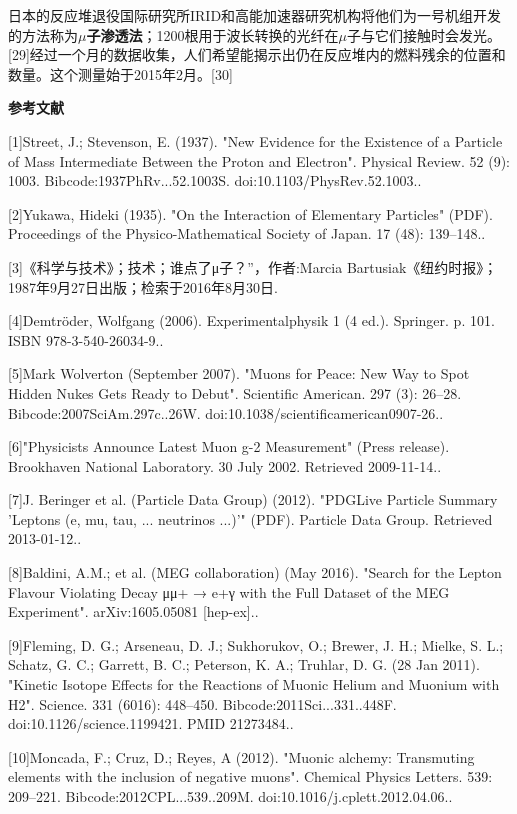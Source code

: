 日本的反应堆退役国际研究所IRID和高能加速器研究机构将他们为一号机组开发的方法称为\textbf{$\mu$子渗透法}；1200根用于波长转换的光纤在$\mu$子与它们接触时会发光。[29]经过一个月的数据收集，人们希望能揭示出仍在反应堆内的燃料残余的位置和数量。这个测量始于2015年2月。[30]

\textbf{参考文献}

[1]Street, J.; Stevenson, E. (1937). "New Evidence for the Existence of a Particle of Mass Intermediate Between the Proton and Electron". Physical Review. 52 (9): 1003. Bibcode:1937PhRv...52.1003S. doi:10.1103/PhysRev.52.1003..

[2]Yukawa, Hideki (1935). "On the Interaction of Elementary Particles" (PDF). Proceedings of the Physico-Mathematical Society of Japan. 17 (48): 139–148..

[3]《科学与技术》；技术；谁点了μ子？”，作者:Marcia Bartusiak《纽约时报》；1987年9月27日出版；检索于2016年8月30日.

[4]Demtröder, Wolfgang (2006). Experimentalphysik 1 (4 ed.). Springer. p. 101. ISBN 978-3-540-26034-9..

[5]Mark Wolverton (September 2007). "Muons for Peace: New Way to Spot Hidden Nukes Gets Ready to Debut". Scientific American. 297 (3): 26–28. Bibcode:2007SciAm.297c..26W. doi:10.1038/scientificamerican0907-26..

[6]"Physicists Announce Latest Muon g-2 Measurement" (Press release). Brookhaven National Laboratory. 30 July 2002. Retrieved 2009-11-14..

[7]J. Beringer et al. (Particle Data Group) (2012). "PDGLive Particle Summary 'Leptons (e, mu, tau, ... neutrinos ...)'" (PDF). Particle Data Group. Retrieved 2013-01-12..


[8]Baldini, A.M.; et al. (MEG collaboration) (May 2016). "Search for the Lepton Flavour Violating Decay μμ+ → e+γ with the Full Dataset of the MEG Experiment". arXiv:1605.05081 [hep-ex]..

[9]Fleming, D. G.; Arseneau, D. J.; Sukhorukov, O.; Brewer, J. H.; Mielke, S. L.; Schatz, G. C.; Garrett, B. C.; Peterson, K. A.; Truhlar, D. G. (28 Jan 2011). "Kinetic Isotope Effects for the Reactions of Muonic Helium and Muonium with H2". Science. 331 (6016): 448–450. Bibcode:2011Sci...331..448F. doi:10.1126/science.1199421. PMID 21273484..

[10]Moncada, F.; Cruz, D.; Reyes, A (2012). "Muonic alchemy: Transmuting elements with the inclusion of negative muons". Chemical Physics Letters. 539: 209–221. Bibcode:2012CPL...539..209M. doi:10.1016/j.cplett.2012.04.06..

